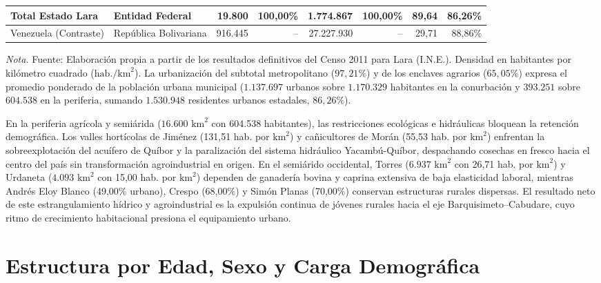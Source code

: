 \documentclass[12pt,letterpaper]{article}
\begin{document}
\begin{table}[htbp]
\begin{tabularx}{\textwidth}{>{\raggedright\arraybackslash}p{3.3cm}>{\raggedright\arraybackslash}Xrrrrrr}
        \midrule
        \textbf{Total Estado Lara} & \textbf{Entidad Federal} & \textbf{19.800} & \textbf{100,00\%} & \textbf{1.774.867} & \textbf{100,00\%} & \textbf{89,64} & \textbf{86,26\%} \\
        \midrule
        Venezuela (Contraste) & República Bolivariana & 916.445 & -- & 27.227.930 & -- & 29,71 & 88,86\% \\
        \bottomrule
    \end{tabularx}
    \par\vspace{2pt}\noindent\raggedright \scriptsize \textit{Nota.} Fuente: Elaboración propia a partir de los resultados definitivos del Censo 2011 para Lara (I.N.E.). Densidad en habitantes por kilómetro cuadrado ($\text{hab./km}^2$). La urbanización del subtotal metropolitano ($97{,}21\%$) y de los enclaves agrarios ($65{,}05\%$) expresa el promedio ponderado de la población urbana municipal ($1.137.697$ urbanos sobre $1.170.329$ habitantes en la conurbación y $393.251$ sobre $604.538$ en la periferia, sumando $1.530.948$ residentes urbanos estadales, $86{,}26\%$).
\end{table}

En la periferia agrícola y semiárida ($16.600\text{ km}^2$ con 604.538 habitantes), las restricciones ecológicas e hidráulicas bloquean la retención demográfica. Los valles hortícolas de Jiménez (131,51 hab. por $\text{km}^2$) y cañicultores de Morán (55,53 hab. por $\text{km}^2$) enfrentan la sobreexplotación del acuífero de Quíbor y la paralización del sistema hidráulico Yacambú-Quíbor, despachando cosechas en fresco hacia el centro del país sin transformación agroindustrial en origen. En el semiárido occidental, Torres ($6.937\text{ km}^2$ con 26,71 hab. por $\text{km}^2$) y Urdaneta ($4.093\text{ km}^2$ con 15,00 hab. por $\text{km}^2$) dependen de ganadería bovina y caprina extensiva de baja elasticidad laboral, mientras Andrés Eloy Blanco (49,00\% urbano), Crespo (68,00\%) y Simón Planas (70,00\%) conservan estructuras rurales dispersas. El resultado neto de este estrangulamiento hídrico y agroindustrial es la expulsión continua de jóvenes rurales hacia el eje Barquisimeto--Cabudare, cuyo ritmo de crecimiento habitacional presiona el equipamiento urbano.

\section{Estructura por Edad, Sexo y Carga Demográfica}
\end{document}
